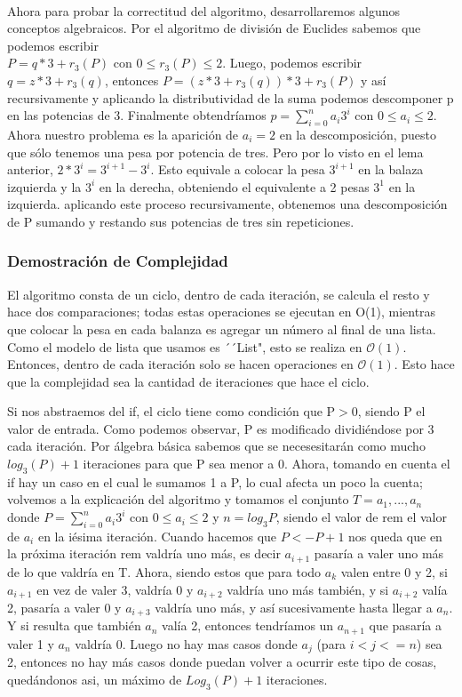 \documentclass[spanish,12pt]{article}
\begin{document}
\\
Ahora para probar la correctitud del algoritmo, desarrollaremos algunos conceptos algebraicos.
Por el algoritmo de división de Euclides sabemos que podemos escribir \\  $P= q*3+ r_{3}(P)$ con $0\leq r_{3}(P) \leq 2 $. Luego, podemos escribir $q= z*3 + r_{3}(q)$, entonces $P= (z*3 + r_{3}(q))*3 +r_{3}(P)$ y así recursivamente y aplicando la distributividad de la suma podemos descomponer p en las potencias de 3. Finalmente obtendríamos $p= \sum_{i=0}^{n}{a_i 3^{i}} $ con $0 \leq a_i \leq 2$.
Ahora nuestro problema es la aparición de $a_i=2$ en la descomposición, puesto que sólo tenemos una pesa por potencia de tres. Pero por lo visto en el lema anterior, $2*3^{i}= 3^{i+1}-3^{i}$. Esto equivale a colocar la pesa $3^{i+1}$ en la balaza izquierda y la $3^{i}$ en la derecha, obteniendo el equivalente a 2 pesas $3^{1}$ en la izquierda. aplicando este proceso recursivamente, obtenemos  una descomposición de P sumando y restando sus potencias de tres sin repeticiones.


\subsubsection{Demostración de Complejidad}

El algoritmo consta de un ciclo, dentro de cada iteración, se calcula el resto y hace dos comparaciones; todas estas operaciones se ejecutan en O(1), mientras que colocar la pesa en cada balanza
es agregar un número al final de una lista. Como el modelo de lista que usamos es ´´List", esto se realiza en $\mathcal{O}(1)$.
Entonces, dentro de cada iteración solo se hacen operaciones en $\mathcal{O}(1)$. Esto hace que la complejidad sea la cantidad de iteraciones que hace el ciclo.

Si nos abstraemos del if, el ciclo tiene como condición que P$>$0, siendo P el valor de entrada. Como podemos observar, P es modificado dividiéndose por 3 cada iteración. Por álgebra básica sabemos que se necesesitarán como mucho $log_3(P) + 1$ iteraciones para que P sea menor a 0.
Ahora, tomando en cuenta el if hay un caso en el cual le sumamos 1 a P, lo cual afecta un poco la cuenta; volvemos a la explicación del algoritmo y tomamos el conjunto $T = {a_1,...,a_n}$ 
donde  $P = \sum_{i=0}^{n} a_i3^i$ con $0 \leq a_i \leq 2$ y $n = log_{3}{P}$, siendo el valor de rem el valor de $a_i$ en la iésima iteración.
Cuando hacemos que $P<-P+1$ nos queda que en la próxima iteración rem valdría uno más, es decir $a_{i+1}$ pasaría a valer uno más de lo que valdría en T. Ahora,  siendo estos que para todo $a_k$
valen entre 0 y 2, si $a_{i+1}$ en vez de valer 3, valdría 0 y $a_{i+2}$ valdría uno más también, y si  $a_{i+2}$ valía 2, pasaría a valer 0 y  $a_{i+3}$ valdría uno más, y así sucesivamente hasta llegar a $a_n$.
Y si resulta que también $a_n$ valía 2, entonces tendríamos un $a_{n+1}$ que pasaría a valer 1 y $a_n$ valdría 0.
Luego no hay mas casos donde $a_j$ (para $i<j<=n$) sea 2, entonces no hay más casos donde puedan volver a ocurrir este tipo de cosas, quedándonos asi, un máximo de $Log_3(P)+1$ iteraciones.
\end{document}
